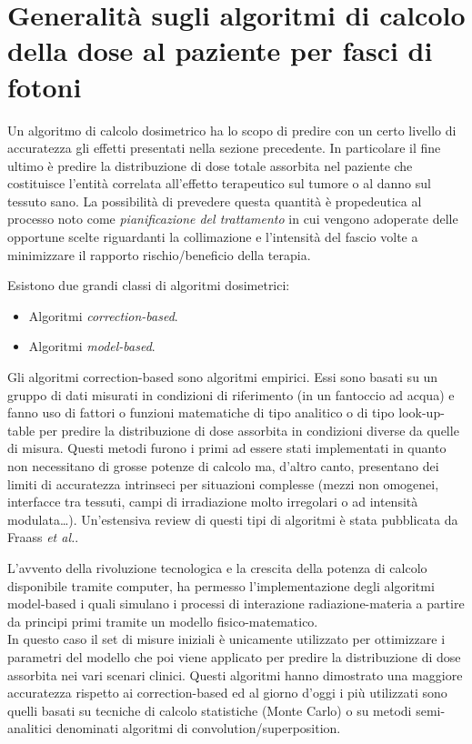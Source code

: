 \section{Generalità sugli algoritmi di calcolo della dose al paziente per fasci di fotoni}
Un algoritmo di calcolo dosimetrico ha lo scopo di predire con un certo livello di accuratezza gli effetti presentati nella sezione precedente. In particolare il fine ultimo è predire la distribuzione di dose totale assorbita nel paziente che costituisce l'entità correlata all'effetto terapeutico sul tumore o al danno sul tessuto sano. La possibilità di prevedere questa quantità è propedeutica al processo noto come \textit{pianificazione del trattamento} in cui vengono adoperate delle opportune scelte riguardanti la collimazione e l'intensità del fascio volte a minimizzare il rapporto rischio/beneficio della terapia.

Esistono due grandi classi di algoritmi dosimetrici:
\begin{itemize}
\item Algoritmi \textit{correction-based}.
\item Algoritmi \textit{model-based}.
\end{itemize}
Gli algoritmi correction-based sono algoritmi empirici. Essi sono  basati su un gruppo di dati misurati in condizioni di riferimento (in un fantoccio ad acqua) e fanno uso di fattori o funzioni matematiche di tipo analitico o di tipo look-up-table per predire la distribuzione di dose assorbita in condizioni diverse da quelle di misura. 
Questi metodi furono i primi ad essere stati implementati in quanto non necessitano di grosse potenze di calcolo ma, d'altro canto, presentano dei limiti di accuratezza intrinseci per situazioni complesse (mezzi non omogenei, interfacce tra tessuti, campi di irradiazione molto irregolari o ad intensità modulata\ldots). Un'estensiva review di questi tipi di algoritmi è stata pubblicata da Fraass \textit{et al.}\cite{Fraass1995}.

\vspace{.2cm}
L'avvento della rivoluzione tecnologica e la crescita della potenza di calcolo disponibile tramite computer, ha permesso l'implementazione degli algoritmi model-based i quali simulano i processi di interazione radiazione-materia  a partire da principi primi tramite un modello fisico-matematico.\\
In questo caso il set di misure iniziali è unicamente utilizzato per ottimizzare i parametri del modello che poi viene applicato per predire la distribuzione di dose assorbita nei vari scenari clinici. Questi algoritmi hanno dimostrato una maggiore accuratezza rispetto ai correction-based ed al giorno d'oggi i più utilizzati sono quelli basati su tecniche di calcolo statistiche (Monte Carlo) o su metodi semi-analitici denominati algoritmi di convolution/superposition.

